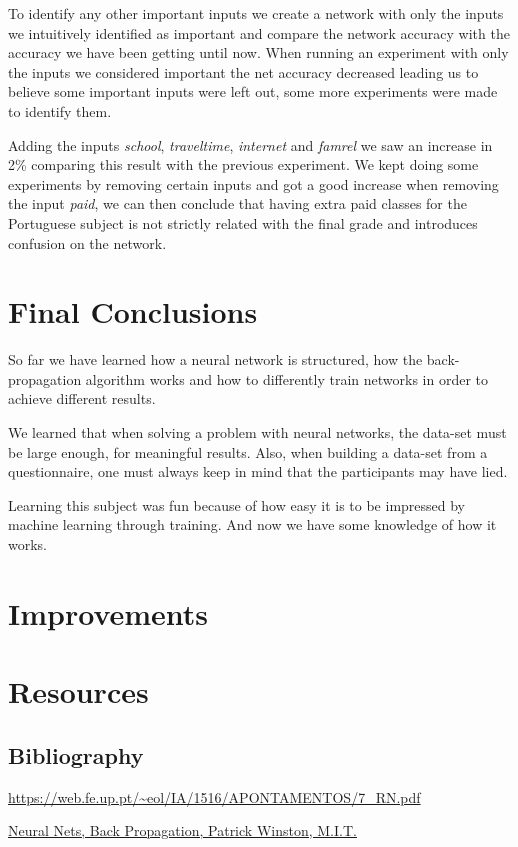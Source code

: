 \documentclass[11pt]{article}
\begin{document}
To identify any other important inputs we create a network with only the inputs we intuitively identified as important and compare the network accuracy with the accuracy we have been getting until now. When running an experiment with only the inputs we considered important the net accuracy decreased leading us to believe some important inputs were left out, some more experiments were made to identify them.

Adding the inputs \textit{school}, \textit{traveltime}, \textit{internet} and \textit{famrel} we saw an increase in 2\% comparing this result with the previous experiment.
We kept doing some experiments by removing certain inputs and got a good increase when removing the input \textit{paid}, we can then conclude that having extra paid classes for the Portuguese subject is not strictly related with the final grade and introduces confusion on the network.

\section{Final Conclusions}
So far we have learned how a neural network is structured, how the back-propagation algorithm works and how to differently train networks in order to achieve different results.

We learned that when solving a problem with neural networks, the data-set must be large enough, for meaningful results. Also, when building a data-set from a questionnaire, one must always keep in mind that the participants may have lied.

Learning this subject was fun because of how easy it is to be impressed by machine learning through training. And now we have some knowledge of how it works.
\section{Improvements}

\section{Resources}

\subsection{Bibliography}

\url{https://web.fe.up.pt/~eol/IA/1516/APONTAMENTOS/7_RN.pdf}

\href{https://www.youtube.com/watch?v=q0pm3BrIUFo}{Neural Nets, Back Propagation, Patrick Winston, M.I.T.}
\end{document}
